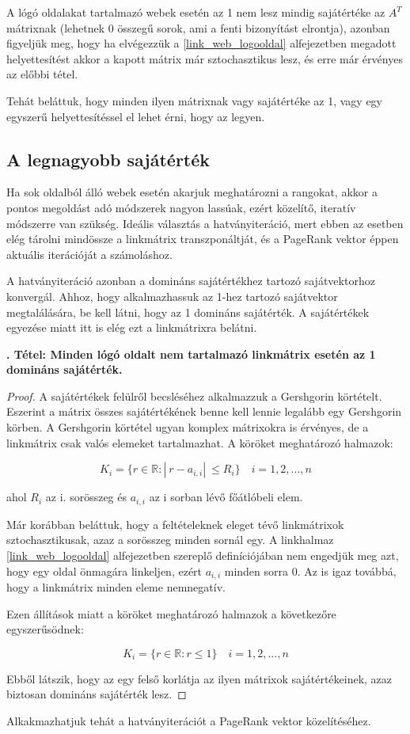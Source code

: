 \documentclass[12pt,a4paper]{article}
\newcounter{tszam}
\newenvironment{tetel}[1]
{{\medskip}\noindent \stepcounter{tszam}
{\bfseries{\thetszam. Tétel: #1\\[1ex]}}}{\bigskip }
\begin{document}
A lógó oldalakat tartalmazó webek esetén az 1 nem lesz mindig sajátértéke az $A^T$ mátrixnak (lehetnek 0 összegű sorok, ami a fenti bizonyítást elrontja), azonban figyeljük meg, hogy ha elvégezzük a \ref{link_web_logooldal} alfejezetben megadott helyettesítést akkor a kapott mátrix már sztochasztikus lesz, és erre már érvényes az előbbi tétel.

Tehát beláttuk, hogy minden ilyen mátrixnak vagy sajátértéke az 1, vagy egy egyszerű helyettesítéssel el lehet érni, hogy az legyen. 

\subsection{A legnagyobb sajátérték}

Ha sok oldalból álló webek esetén akarjuk meghatározni a rangokat, akkor a pontos megoldást adó módszerek nagyon lassúak, ezért közelítő, iteratív módszerre van szükség. Ideális választás a hatványiteráció, mert ebben az esetben elég tárolni mindössze a linkmátrix transzponáltját, és a PageRank vektor éppen aktuális iterációját a számoláshoz.

A hatványiteráció azonban a domináns sajátértékhez tartozó sajátvektorhoz konvergál. Ahhoz, hogy alkalmazhassuk az 1-hez tartozó sajátvektor megtalálására, be kell látni, hogy az 1 domináns sajátérték. A sajátértékek egyezése miatt itt is elég ezt a linkmátrixra belátni.

\begin{tetel}{Minden lógó oldalt nem tartalmazó linkmátrix esetén az 1 domináns sajátérték.}
\end{tetel}

\begin{proof}
	A sajátértékek felülről becsléséhez alkalmazzuk a Gershgorin körtételt. Eszerint a mátrix összes sajátértékének benne kell lennie legalább egy Gershgorin körben. A Gershgorin körtétel ugyan komplex mátrixokra is érvényes, de a linkmátrix csak valós elemeket tartalmazhat. A köröket meghatározó halmazok: 
	
	\[ K_i = \{ r \in \mathbb{R}: |\ r - a_{i,i} |\ \leq R_i \} \quad i = 1,2,...,n \]
	
	ahol $R_i$ az i. sorösszeg és $a_{i,i}$ az i sorban lévő főátlóbeli elem.
	
	Már korábban beláttuk, hogy a feltételeknek eleget tévő linkmátrixok sztochasztikusak, azaz a sorösszeg minden sornál egy. A linkhalmaz \ref{link_web_logooldal} alfejezetben szereplő definíciójában nem engedjük meg azt, hogy egy oldal önmagára linkeljen, ezért $a_{i,i}$ minden sorra 0. Az is igaz továbbá, hogy a linkmátrix minden eleme nemnegatív.
	
	Ezen állítások miatt a köröket meghatározó halmazok a következőre egyszerűsödnek:
	
	\[ K_i = \{ r \in \mathbb{R}: r \leq 1 \} \quad i = 1,2,...,n \]
	
	Ebből látszik, hogy az egy felső korlátja az ilyen mátrixok sajátértékeinek, azaz biztosan domináns sajátérték lesz.
\end{proof}

Alkakmazhatjuk tehát a hatványiterációt a PageRank vektor közelítéséhez.



\end{document}

